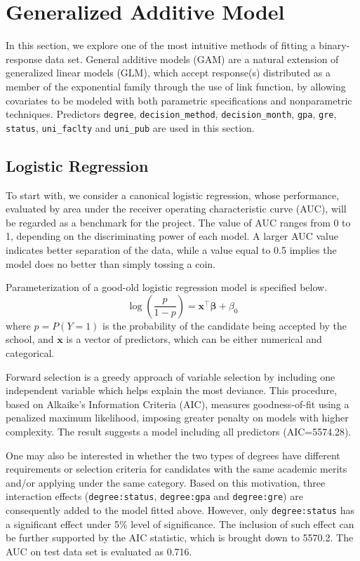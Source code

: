 \section{Generalized Additive Model}
In this section, we explore one of the most intuitive methods of fitting a binary-response data set. General additive models (GAM) are a natural extension of generalized linear models (GLM), which accept response(s) distributed as a member of the exponential family through the use of link function, by allowing covariates to be modeled with both parametric specifications and nonparametric techniques. Predictors \texttt{degree}, \texttt{decision_method}, \texttt{decision_month}, \texttt{gpa}, \texttt{gre}, \texttt{status}, \texttt{uni_faclty} and \texttt{uni_pub} are used in this section.
\subsection{Logistic Regression}
To start with, we consider a canonical logistic regression, whose performance, evaluated by area under the receiver operating characteristic curve (AUC), will be regarded as a benchmark for the project. The value of AUC ranges from 0 to 1, depending on the discriminating power of each model. A larger AUC value indicates better separation of the data, while a value equal to 0.5 implies the model does no better than simply tossing a coin.
\par Parameterization of a good-old logistic regression model is specified below.
\[
\log\left(\frac{p}{1-p}\right)=\mathbf{x}^\top\boldsymbol{\beta}+\beta_0
\]
where $p=P(Y=1)$ is the probability of the candidate being accepted by the school, and $\mathbf{x}$ is a vector of predictors, which can be either numerical and categorical. 
\par Forward selection is a greedy approach of variable selection by including one independent variable which helps explain the most deviance. This procedure, based on Alkaike's Information Criteria (AIC), measures goodness-of-fit using a penalized maximum likelihood, imposing greater penalty on models with higher complexity. The result suggests a model including all predictors (AIC=5574.28).
\par One may also be interested in whether the two types of degrees have different requirements or selection criteria for candidates with the same academic merits and/or applying under the same category. Based on this motivation, three interaction effects (\texttt{degree:status}, \texttt{degree:gpa} and \texttt{degree:gre}) are consequently added to the model fitted above. However, only \texttt{degree:status} has a significant effect under 5\% level of significance. The inclusion of such effect can be further supported by the AIC statistic, which is brought down to 5570.2. The AUC on test data set is evaluated as 0.716.

